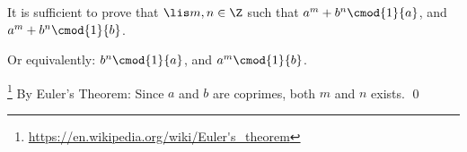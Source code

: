         It is sufficient to prove that $\lis m,n \in \Z$ such that 
        $a^m+b^n \cmod{1}{a}$, and $a^m+b^n \cmod{1}{b}$.

        Or equivalently: $b^n \cmod{1}{a}$, and $a^m \cmod{1}{b}$.

        \footnote{\url{https://en.wikipedia.org/wiki/Euler's_theorem}}
        By Euler's Theorem:
        Since $a$ and $b$ are coprimes,
        both $m$ and $n$ exists.
        \qed